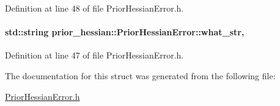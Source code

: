 Definition at line 48 of file Prior\+Hessian\+Error.\+h.

\paragraph[{\texorpdfstring{what\+\_\+str}{what_str}}]{\setlength{\rightskip}{0pt plus 5cm}std\+::string prior\+\_\+hessian\+::\+Prior\+Hessian\+Error\+::what\+\_\+str\hspace{0.3cm}{\ttfamily [protected]}, {\ttfamily [inherited]}}\hypertarget{classprior__hessian_1_1PriorHessianError_a0d97e1b6b1bcf6a440400706f416375e}{}\label{classprior__hessian_1_1PriorHessianError_a0d97e1b6b1bcf6a440400706f416375e}


Definition at line 47 of file Prior\+Hessian\+Error.\+h.



The documentation for this struct was generated from the following file\+:\begin{DoxyCompactItemize}
\item 
\hyperlink{PriorHessianError_8h}{Prior\+Hessian\+Error.\+h}\end{DoxyCompactItemize}
